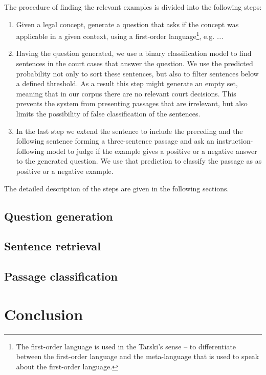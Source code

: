 \documentclass{IOS-Book-Article}
\begin{document}
The procedure of finding the relevant examples is divided into the following steps:
\begin{enumerate}
  \item Given a legal concept, generate a question that asks if the concept was applicable in a given context,
    using a first-order language\footnote{The first-order language is used in the Tarski's sense -- to differentiate
    between the first-order language and the meta-language that is used to speak about the first-order language.}, e.g. 
    \textit{...} %
  \item Having the question generated, we use a binary classification model to find sentences in the court cases that answer the question. 
    We use the predicted probability not only to sort these sentences, but also to filter sentences below a defined threshold.
    As a result this step might generate an empty set, meaning that in our corpus there are no relevant court decisions. 
    This prevents the system from presenting passages that are irrelevant, but also limits the possibility of false
    classification of the sentences.
  \item In the last step we extend the sentence to include the preceding and the following sentence forming a three-sentence passage
    and ask an instruction-following model to judge if the example gives a positive or a negative answer to the generated question.
    We use that prediction to classify the passage as as positive or a negative example.
\end{enumerate}

The detailed description of the steps are given in the following sections.

\subsection{Question generation}


\subsection{Sentence retrieval}


\subsection{Passage classification}

\section{Conclusion}
\end{document}
